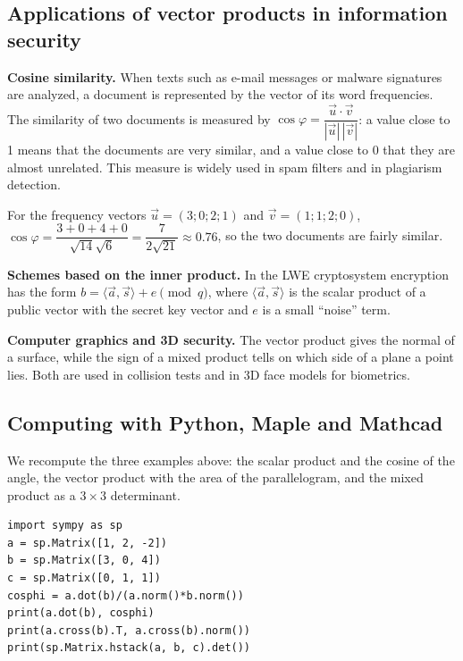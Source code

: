 \subsection{Applications of vector products in information security}

\textbf{Cosine similarity.} When texts such as e-mail messages or malware
signatures are analyzed, a document is represented by the vector of its
word frequencies. The similarity of two documents is measured by
$\cos\varphi=\dfrac{\vec u\cdot\vec v}{|\vec u|\,|\vec v|}$: a value close
to 1 means that the documents are very similar, and a value close to 0 that
they are almost unrelated. This measure is widely used in spam filters and
in plagiarism detection.

\begin{misol}
For the frequency vectors $\vec u=(3;0;2;1)$ and $\vec v=(1;1;2;0)$,
$\cos\varphi=\dfrac{3+0+4+0}{\sqrt{14}\sqrt6}=\dfrac{7}{2\sqrt{21}}\approx0.76$,
so the two documents are fairly similar.
\end{misol}

\textbf{Schemes based on the inner product.}
In the LWE cryptosystem encryption has the form
$b=\langle\vec a,\vec s\rangle+e \pmod q$, where
$\langle\vec a,\vec s\rangle$ is the scalar product of a public vector with
the secret key vector and $e$ is a small “noise” term.

\textbf{Computer graphics and 3D security.} The vector product gives the
normal of a surface, while the sign of a mixed product tells on which side
of a plane a point lies. Both are used in collision tests and in 3D face
models for biometrics.

\subsection{Computing with Python, Maple and Mathcad}

We recompute the three examples above: the scalar product and the cosine
of the angle, the vector product with the area of the parallelogram, and
the mixed product as a $3\times3$ determinant.

\begin{Verbatim}[fontsize=\footnotesize,frame=single,label={\small Python}]
import sympy as sp
a = sp.Matrix([1, 2, -2])
b = sp.Matrix([3, 0, 4])
c = sp.Matrix([0, 1, 1])
cosphi = a.dot(b)/(a.norm()*b.norm())
print(a.dot(b), cosphi)
print(a.cross(b).T, a.cross(b).norm())
print(sp.Matrix.hstack(a, b, c).det())
\end{Verbatim}

